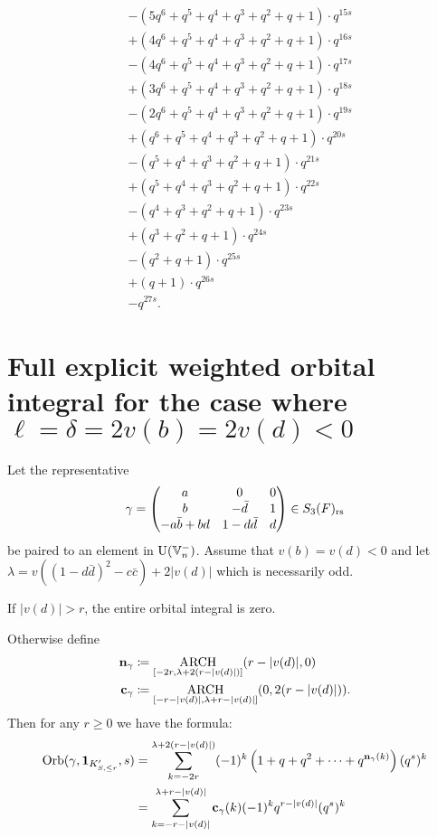 \begin{example}
\begin{align*}
    &- (5q^6 + q^5 + q^4 + q^3 + q^2 + q + 1) \cdot q^{15s} \\
    &+ (4q^6 + q^5 + q^4 + q^3 + q^2 + q + 1) \cdot q^{16s} \\
    &- (4q^6 + q^5 + q^4 + q^3 + q^2 + q + 1) \cdot q^{17s} \\
    &+ (3q^6 + q^5 + q^4 + q^3 + q^2 + q + 1) \cdot q^{18s} \\
    &- (2q^6 + q^5 + q^4 + q^3 + q^2 + q + 1) \cdot q^{19s} \\
    &+ (q^6 + q^5 + q^4 + q^3 + q^2 + q + 1) \cdot q^{20s} \\
    &- (q^5 + q^4 + q^3 + q^2 + q + 1) \cdot q^{21s} \\
    &+ (q^5 + q^4 + q^3 + q^2 + q + 1) \cdot q^{22s} \\
    &- (q^4 + q^3 + q^2 + q + 1) \cdot q^{23s} \\
    &+ (q^3 + q^2 + q + 1) \cdot q^{24s} \\
    &- (q^2 + q + 1) \cdot q^{25s} \\
    &+ (q + 1) \cdot q^{26s} \\
    &- q^{27s}.
  \end{align*}
\end{example}

\section{Full explicit weighted orbital integral for the case where $\ell = \delta = 2v(b) = 2v(d) < 0$}
\begin{theorem}
  \label{thm:full_orbital_ell_neg}
  Let the representative
  \[ \gamma = \begin{pmatrix}
      a & 0 & 0 \\
      b & - \bar d & 1 \\
      -a \bar b + b d & 1 - d \bar d & d
    \end{pmatrix} \in S_3(F)_{\mathrm{rs}} \]
  be paired to an element in $\operatorname{U}(\mathbb V_n^-)$.
  Assume that $v(b) = v(d) < 0$ and let
  $\lambda = v((1 - d \bar d)^2 - c \bar c) + 2|v(d)|$
  which is necessarily odd.

  If $|v(d)| > r$, the entire orbital integral is zero.

  Otherwise define
  \begin{align*}
    \mathbf n_\gamma &\coloneqq \operatorname*{ARCH}_{[-2r, \lambda + 2(r-|v(d)|)]}(r-|v(d)|, 0) \\
    \mathbf c_\gamma &\coloneqq \operatorname*{ARCH}_{[-r-|v(d)|, \lambda + r-|v(d)|]} (0, 2(r-|v(d)|)).
  \end{align*}
  Then for any $r \ge 0$ we have the formula:
  \begin{align*}
    \operatorname{Orb}(\gamma, \mathbf{1}_{K'_{S, \le r}}, s)
    &= \sum_{k = -2r}^{\lambda + 2(r-|v(d)|)}
    (-1)^k \left( 1 + q + q^2 + \dots + q^{\mathbf n_{\gamma}(k)} \right) (q^s)^k \\
    &= \sum_{k = -r-|v(d)|}^{\lambda + r - |v(d)|} \mathbf c_\gamma(k) (-1)^k q^{r-|v(d)|} (q^s)^k \\
  \end{align*}
\end{theorem}
